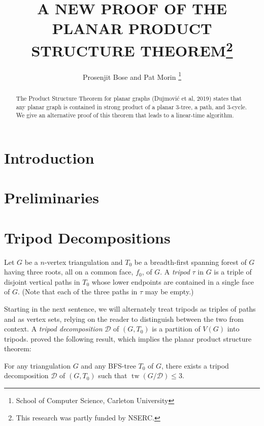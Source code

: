 \documentclass{patmorin}
\title{\MakeUppercase{A New Proof of the Planar Product Structure Theorem}\thanks{This research was partly funded by NSERC.}}
\author{Prosenjit Bose and Pat Morin%
    \thanks{School of Computer Science, Carleton University}}
\date{}
\DeclareMathOperator{\tw}{tw}
\begin{document}
\maketitle

\begin{abstract}
    The Product Structure Theorem for planar graphs (Dujmović et al, 2019) states that any planar graph is contained in strong product of a planar $3$-tree, a path, and $3$-cycle.  We give an alternative proof of this theorem that leads to a linear-time algorithm.
\end{abstract}

%

\section{Introduction}

\section{Preliminaries}





\section{Tripod Decompositions}


Let $G$ be a $n$-vertex triangulation and $T_0$ be a breadth-first spanning forest of $G$ having three roots, all on a common face, $f_0$, of $G$.  A \emph{tripod} $\tau$ in $G$ is a triple of disjoint vertical paths in $T_0$ whose lower endpoints are contained in a single face of $G$.  (Note that each of the three paths in $\tau$ may be empty.)

Starting in the next sentence, we will alternately treat tripods as triples of paths and as vertex sets, relying on the reader to distinguish between the two from context.  A \emph{tripod decomposition} $\mathcal{D}$ of $(G,T_0)$ is a partition of $V(G)$ into tripods.  \citet{dujmovic.joret.ea:planar} proved the following result, which implies the planar product structure theorem:

\begin{thm}\label{tripod_decomposition}
  For any triangulation $G$ and any BFS-tree $T_0$ of $G$, there exists a tripod decomposition $\mathcal{D}$ of $(G,T_0)$ such that $\tw(G/\mathcal{D})\le 3$.
\end{thm}
\end{document}
